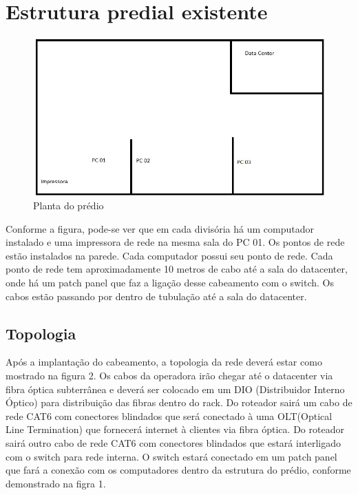 \documentclass[	DIV=calc,%
paper=a4,%
fontsize=12pt,%
onecolumn]{scrartcl}	 					%
\begin{document}
	\section{Estrutura predial existente}
	\begin{figure}
		\centering
		\includegraphics[width=\textwidth]{planta}
		\caption{Planta do prédio}
		\label{planta}
	\end{figure}
	
	Conforme a figura, pode-se ver que em cada divisória há um computador instalado e uma impressora de rede na mesma sala do PC 01.
	Os pontos de rede estão instalados na parede. Cada computador possui seu ponto de rede.
	Cada ponto de rede tem aproximadamente 10 metros de cabo até a sala do datacenter, onde há um patch panel que faz a ligação desse cabeamento com o switch. Os cabos estão passando por dentro de tubulação até a sala do datacenter.
	
	\subsection{Topologia}
	Após a implantação do cabeamento, a topologia da rede deverá estar como mostrado na figura 2. Os cabos da operadora irão chegar até o datacenter via fibra óptica subterrânea e deverá ser colocado em um DIO (Distribuidor Interno Óptico) para distribuição das fibras dentro do rack. 
	Do roteador sairá um cabo de rede CAT6 com conectores blindados que será conectado à uma OLT(Optical Line Termination) que fornecerá internet à clientes via fibra óptica.
	Do roteador sairá outro cabo de rede CAT6 com conectores blindados que estará interligado com o switch para rede interna. O switch estará conectado em um patch panel que fará a conexão com os computadores dentro da estrutura do prédio, conforme demonstrado na figra 1.
	
\end{document}
